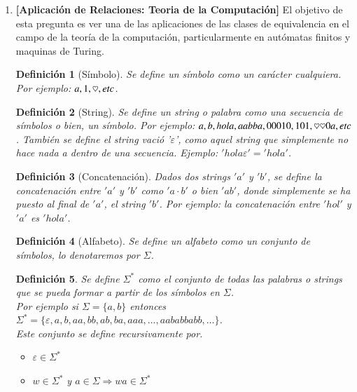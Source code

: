 \documentclass[letterpaper,11pt]{article}
\newcommand{\heart}{\ensuremath\heartsuit}
\theoremstyle{plain}
\newtheorem{defi}{Definición}[section]
\begin{document}
\begin{enumerate}[\bf P5.]
    \item \textbf{[Aplicación de Relaciones: Teoria de la Computación]} El objetivo de esta pregunta es ver una de las aplicaciones de las clases de equivalencia en el campo de la teoría de la computación, particularmente en autómatas finitos y maquinas de Turing.
        \begin{defi}[Símbolo]
        Se define un símbolo como un carácter cualquiera. Por ejemplo: $a,1,\heart,etc$. 
        \end{defi}
        
        \begin{defi}[String]
            Se define un string o palabra como una secuencia de símbolos o bien, un símbolo. Por ejemplo: $a,b,hola,aabba,00010,101,\heart \heart 0a,etc$.
            También se define el string vació '$\varepsilon$', como aquel string que simplemente no hace nada a dentro de una secuencia. Ejemplo: $'hola\varepsilon'='hola'$.
        \end{defi}
        
        \begin{defi}[Concatenación]
        Dados dos strings $'a'$ y $'b'$, se define la concatenación entre $'a'$ y $'b'$ como $'a\cdot b'$ o bien $'ab'$, donde simplemente se ha puesto al final de $'a'$, el string $'b'$. Por ejemplo: la concatenación entre $'hol'$ y $'a'$ es $'hola'$. 
        \end{defi}
        
        \begin{defi}[Alfabeto] 
        Se define un alfabeto como un conjunto de símbolos, lo denotaremos por $\Sigma$.
        \end{defi}
        
        \begin{defi}
        Se define $\Sigma^*$ como el conjunto de todas las palabras o strings que se pueda formar a partir de los símbolos en $\Sigma$.\\
        Por ejemplo si $\Sigma=\{a,b\}$ entonces $\Sigma^*=\{\varepsilon, a,b,aa,bb,ab,ba,aaa,\dots, aababbabb,\dots \}$.\\
        Este conjunto se define recursivamente por.
            \begin{itemize}
                \item $\varepsilon \in \Sigma^*$
                \item $w \in \Sigma^*$ y $a \in \Sigma \Rightarrow wa\in \Sigma^*$
            \end{itemize}
        \end{defi}
        

\end{enumerate}
\end{document}
